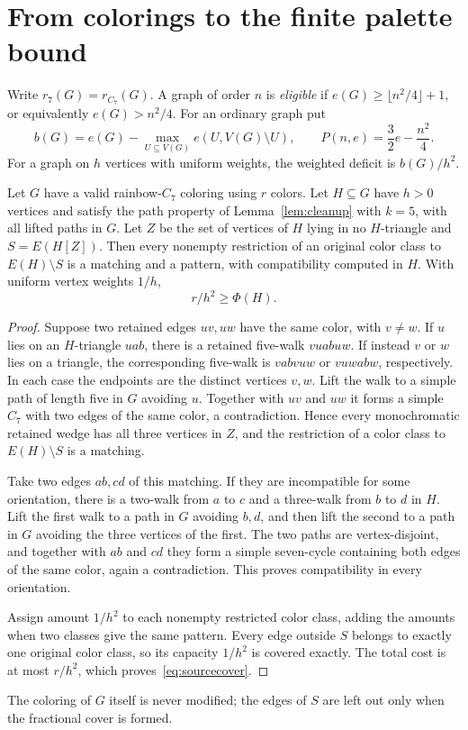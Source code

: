 \section{From colorings to the finite palette bound}\label{sec:source}
Write $r_7(G)=r_{C_7}(G)$. A graph of order $n$ is \emph{eligible} if $e(G)\ge\lfloor n^2/4\rfloor+1$, or equivalently $e(G)>n^2/4$. For an ordinary graph put
\[
 b(G)=e(G)-\max_{U\subseteq V(G)}e(U,V(G)\setminus U),
 \qquad P(n,e)=\frac32e-\frac{n^2}{4}.
\]
For a graph on $h$ vertices with uniform weights, the weighted deficit is $b(G)/h^2$.

\begin{lemma}\label{lem:sourcepatterns}
Let $G$ have a valid rainbow-$C_7$ coloring using $r$ colors. Let $H\subseteq G$ have $h>0$ vertices and satisfy the path property of Lemma~\ref{lem:cleanup} with $k=5$, with all lifted paths in $G$. Let $Z$ be the set of vertices of $H$ lying in no $H$-triangle and $S=E(H[Z])$. Then every nonempty restriction of an original color class to $E(H)\setminus S$ is a matching and a pattern, with compatibility computed in $H$. With uniform vertex weights $1/h$,
\begin{equation}\label{eq:sourcecover}
 r/h^2\ge\Phi(H).
\end{equation}
\end{lemma}
\begin{proof}
Suppose two retained edges $uv,uw$ have the same color, with $v\ne w$. If $u$ lies on an $H$-triangle $uab$, there is a retained five-walk $vuabuw$. If instead $v$ or $w$ lies on a triangle, the corresponding five-walk is $vabvuw$ or $vuwabw$, respectively. In each case the endpoints are the distinct vertices $v,w$. Lift the walk to a simple path of length five in $G$ avoiding $u$. Together with $uv$ and $uw$ it forms a simple $C_7$ with two edges of the same color, a contradiction. Hence every monochromatic retained wedge has all three vertices in $Z$, and the restriction of a color class to $E(H)\setminus S$ is a matching.

Take two edges $ab,cd$ of this matching. If they are incompatible for some orientation, there is a two-walk from $a$ to $c$ and a three-walk from $b$ to $d$ in $H$. Lift the first walk to a path in $G$ avoiding $b,d$, and then lift the second to a path in $G$ avoiding the three vertices of the first. The two paths are vertex-disjoint, and together with $ab$ and $cd$ they form a simple seven-cycle containing both edges of the same color, again a contradiction. This proves compatibility in every orientation.

Assign amount $1/h^2$ to each nonempty restricted color class, adding the amounts when two classes give the same pattern. Every edge outside $S$ belongs to exactly one original color class, so its capacity $1/h^2$ is covered exactly. The total cost is at most $r/h^2$, which proves~\eqref{eq:sourcecover}.
\end{proof}
The coloring of $G$ itself is never modified; the edges of $S$ are left out only when the fractional cover is formed.

